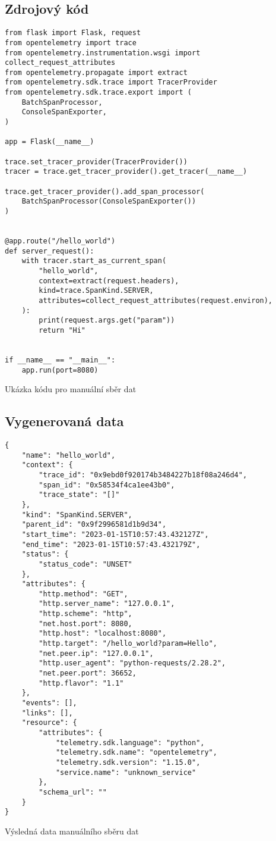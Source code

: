 \subsection*{Zdrojový kód}
\begin{listing}[H]
    \begin{verbatim}
from flask import Flask, request
from opentelemetry import trace
from opentelemetry.instrumentation.wsgi import collect_request_attributes
from opentelemetry.propagate import extract
from opentelemetry.sdk.trace import TracerProvider
from opentelemetry.sdk.trace.export import (
    BatchSpanProcessor,
    ConsoleSpanExporter,
)

app = Flask(__name__)

trace.set_tracer_provider(TracerProvider())
tracer = trace.get_tracer_provider().get_tracer(__name__)

trace.get_tracer_provider().add_span_processor(
    BatchSpanProcessor(ConsoleSpanExporter())
)


@app.route("/hello_world")
def server_request():
    with tracer.start_as_current_span(
        "hello_world",
        context=extract(request.headers),
        kind=trace.SpanKind.SERVER,
        attributes=collect_request_attributes(request.environ),
    ):
        print(request.args.get("param"))
        return "Hi"


if __name__ == "__main__":
    app.run(port=8080)
\end{verbatim}
    \caption{Ukázka kódu pro manuální sběr dat}
    \label{lst:exampleCode1}
\end{listing}

\subsection*{Vygenerovaná data}

\begin{listing}[H]
    \begin{verbatim}
{
    "name": "hello_world",
    "context": {
        "trace_id": "0x9ebd0f920174b3484227b18f08a246d4",
        "span_id": "0x58534f4ca1ee43b0",
        "trace_state": "[]"
    },
    "kind": "SpanKind.SERVER",
    "parent_id": "0x9f2996581d1b9d34",
    "start_time": "2023-01-15T10:57:43.432127Z",
    "end_time": "2023-01-15T10:57:43.432179Z",
    "status": {
        "status_code": "UNSET"
    },
    "attributes": {
        "http.method": "GET",
        "http.server_name": "127.0.0.1",
        "http.scheme": "http",
        "net.host.port": 8080,
        "http.host": "localhost:8080",
        "http.target": "/hello_world?param=Hello",
        "net.peer.ip": "127.0.0.1",
        "http.user_agent": "python-requests/2.28.2",
        "net.peer.port": 36652,
        "http.flavor": "1.1"
    },
    "events": [],
    "links": [],
    "resource": {
        "attributes": {
            "telemetry.sdk.language": "python",
            "telemetry.sdk.name": "opentelemetry",
            "telemetry.sdk.version": "1.15.0",
            "service.name": "unknown_service"
        },
        "schema_url": ""
    }
}
\end{verbatim}
    \caption{Výsledná data manuálního sběru dat}
    \label{lst:exampleCodeResult1}
\end{listing}


